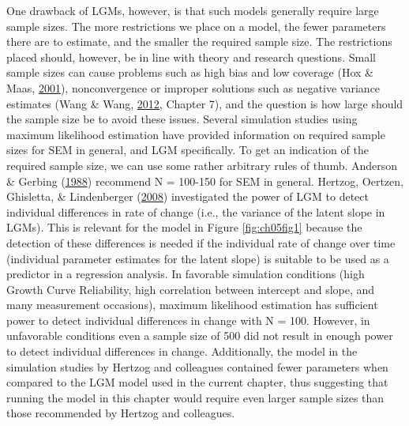 \documentclass[openright,titlepage,12pt,a4paper]{book}
\begin{document}
One drawback of LGMs, however, is that such models generally require large sample sizes. The more restrictions we place on a model, the fewer parameters there are to estimate, and the smaller the required sample size. The restrictions placed should, however, be in line with theory and research questions. Small sample sizes can cause problems such as high bias and low coverage (Hox \& Maas, \protect\hyperlink{ref-hox_accuracy_2001}{2001}), nonconvergence or improper solutions such as negative variance estimates (Wang \& Wang, \protect\hyperlink{ref-wang_structural_2012}{2012}, Chapter 7), and the question is how large should the sample size be to avoid these issues. Several simulation studies using maximum likelihood estimation have provided information on required sample sizes for SEM in general, and LGM specifically. To get an indication of the required sample size, we can use some rather arbitrary rules of thumb. Anderson \& Gerbing (\protect\hyperlink{ref-anderson_structural_1988}{1988}) recommend N = 100-150 for SEM in general. Hertzog, Oertzen, Ghisletta, \& Lindenberger (\protect\hyperlink{ref-hertzog_evaluating_2008}{2008}) investigated the power of LGM to detect individual differences in rate of change (i.e., the variance of the latent slope in LGMs). This is relevant for the model in Figure \ref{fig:ch05fig1} because the detection of these differences is needed if the individual rate of change over time (individual parameter estimates for the latent slope) is suitable to be used as a predictor in a regression analysis. In favorable simulation conditions (high Growth Curve Reliability, high correlation between intercept and slope, and many measurement occasions), maximum likelihood estimation has sufficient power to detect individual differences in change with N = 100. However, in unfavorable conditions even a sample size of 500 did not result in enough power to detect individual differences in change. Additionally, the model in the simulation studies by Hertzog and colleagues contained fewer parameters when compared to the LGM model used in the current chapter, thus suggesting that running the model in this chapter would require even larger sample sizes than those recommended by Hertzog and colleagues.
\end{document}
